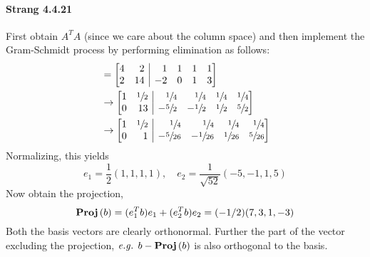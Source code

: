 \documentclass[10pt]{article}
\makeatletter
\newenvironment{sysmatrix}[1]
 {\left[\begin{array}{@{}#1@{}}}
 {\end{array}\right]}
\newcommand{\proj}{\mathop{\bf Proj}}
\newcommand{\eg}{{\it e.g.}}
\makeatother
\begin{document}
\paragraph{Strang 4.4.21} First obtain $A^T A$ (since we care about the column space) and then implement the Gram-Schmidt process by performing elimination as follows:
\begin{align*}
	[A^T A\mid A^T] &= \begin{sysmatrix}{rr|rrrr}
		4&2&1&1&1&1\\2&14&-2&0&1&3
	\end{sysmatrix}\\
	&\rightarrow 
	\begin{sysmatrix}{rr|rrrr}
		1&\sfrac{1}{2}&\sfrac{1}{4}&\sfrac{1}{4}&\sfrac{1}{4}&\sfrac{1}{4}\\
		0&13&-\sfrac{5}{2}&-\sfrac{1}{2}&\sfrac{1}{2}&\sfrac{5}{2}
	\end{sysmatrix}\\
	&\rightarrow
	\begin{sysmatrix}{rr|rrrr}
		1&\sfrac{1}{2}&\sfrac{1}{4}&\sfrac{1}{4}&\sfrac{1}{4}&\sfrac{1}{4}\\
		0&1&-\sfrac{5}{26}&-\sfrac{1}{26}&\sfrac{1}{26}&\sfrac{5}{26}
	\end{sysmatrix}
\end{align*}
Normalizing, this yields
\[e_1 = \frac{1}{2}(1,1,1,1),\quad e_2=\frac{1}{\sqrt{52}}(-5,-1,1,5)\]
Now obtain the projection,
\[\proj{(b)} = (e_{1}^{T} b) e_{1} + (e_{2}^{T} b) e_{2} = (-1/2)(7,3,1,-3)\]
Both the basis vectors are clearly orthonormal. Further the part of the vector excluding the projection, $\eg$  $b-\proj{(b)}$ is also orthogonal to the basis.
\end{document}
